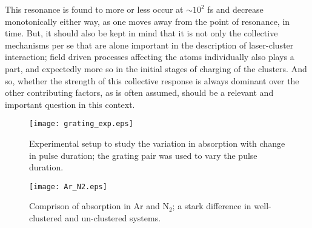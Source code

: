 \documentclass[a4paper,12pt]{article}
\begin{document}
This resonance is found to more or less occur at $\sim10^{2}$ fs and decrease monotonically either way, as one moves away from the point of resonance, in time. But, it should also be kept in mind that it is not only the collective mechanisms per se that are alone important in the description of laser-cluster interaction; field driven processes affecting the atoms individually also plays a part, and expectedly more so in the initial stages of charging of the clusters. And so, whether the strength of this collective response is always dominant over the other contributing factors, as is often assumed, should be a relevant and important question in this context.

\begin{figure}[h]
  \centering
  \begin{minipage}[b]{0.495\textwidth}
    \texttt{[image: grating\_exp.eps]}
    \caption{Experimental setup to study the variation in absorption with change in pulse duration; the grating pair was used to vary the pulse duration.}
    \label{grating_exp}
  \end{minipage}
  \hfill
  \begin{minipage}[b]{0.495\textwidth}
    \texttt{[image: Ar\_N2.eps]}
    \caption{Comprison of absorption in Ar and N$_{2}$; a stark difference in well-clustered and un-clustered systems.}
    \label{Ar_N2}
  \end{minipage}
\end{figure}
\end{document}
